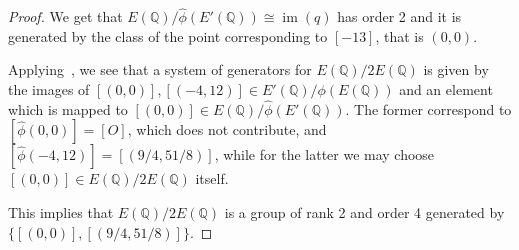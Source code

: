 \documentclass{article}
\newcommand{\numberset}{\mathbb}
\newcommand{\Q}{\numberset{Q}}
\DeclareMathOperator{\im}{im}
\begin{document}
\begin{proof}
    We get that $E(\Q)/\hat{\phi}(E'(\Q))\cong\im(q)$ has order 2 and it is
    generated by the class of the point corresponding to $[-13]$, that is
    $(0,0)$.

    Applying~\cite[lemma 9]{Bri18}, we see that a system of generators for
    $E(\Q)/2E(\Q)$ is given by the images of $[(0,0)],[(-4,12)]\in
    E'(\Q)/\phi(E(\Q))$ and an element which is mapped to $[(0,0)]\in
    E(\Q)/\hat{\phi}(E'(\Q))$. The former correspond to $[\hat{\phi}(0,0)]=[O]$,
    which does not contribute, and $[\hat{\phi}(-4,12)]=[(9/4,51/8)]$, while for
    the latter we may choose $[(0,0)]\in E(\Q)/2E(\Q)$ itself.

    This implies that $E(\Q)/2E(\Q)$ is a group of rank 2 and order 4 generated
    by $\{[(0,0)],[(9/4,51/8)]\}$.
\end{proof}


\printbibliography
\end{document}
